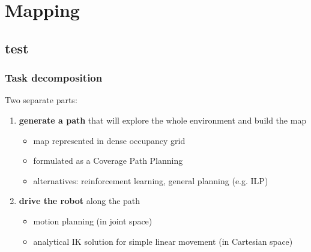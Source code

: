 \documentclass{beamer}
\begin{document}
\section{Mapping}
\subsection{test}


\begin{frame}
  \frametitle{Task decomposition}
  Two separate parts:

  \begin{enumerate}
  \item \textbf{generate a path} that will explore the whole environment and build the map
      \begin{itemize}
      \item map represented in dense occupancy grid
      \item formulated as a Coverage Path Planning
      \item alternatives: reinforcement learning, general planning (e.g. ILP)
      \end{itemize}

  \item \textbf{drive the robot} along the path
      \begin{itemize}
      \item motion planning (in joint space)
      \item analytical IK solution for simple linear movement (in Cartesian space)
      \end{itemize}
  \end{enumerate}
\end{frame}
\end{document}

